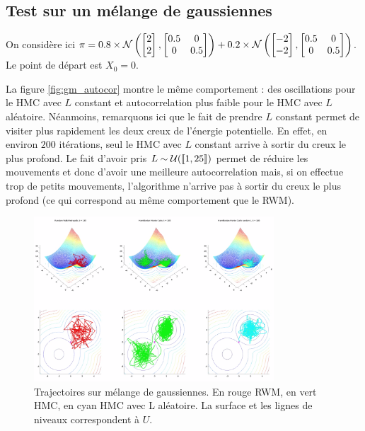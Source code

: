 \documentclass[10pt,a4paper]{article}
\begin{document}
\pagebreak
\subsection{Test sur un mélange de gaussiennes}
On considère ici $\pi = 0.8 \times \mathcal{N}\left(\begin{bmatrix} 2 \\ 2 \end{bmatrix}, \begin{bmatrix}
0.5 & 0 \\ 0 & 0.5 \end{bmatrix}\right) + 0.2 \times \mathcal{N}\left(\begin{bmatrix} -2 \\ -2 \end{bmatrix}, \begin{bmatrix} 0.5 & 0 \\ 0 & 0.5 \end{bmatrix}\right)$. Le point de départ est $X_0 = 0$. 

La figure \ref{fig:gm_autocor} montre le même comportement : des oscillations pour le HMC avec $L$ constant et autocorrelation plus faible pour le HMC avec $L$ aléatoire. Néanmoins, remarquons ici que le fait de prendre $L$ constant permet de visiter plus rapidement les deux creux de l'énergie potentielle. En effet, en environ $200$ itérations, seul le HMC avec $L$ constant arrive à sortir du creux le plus profond. Le fait d'avoir pris $L \sim \mathcal{U}({\left\llbracket 1,25 \right\rrbracket})$ permet de réduire les mouvements et donc d'avoir une meilleure autocorrelation mais, si on effectue trop de petits mouvements, l'algorithme n'arrive pas à sortir du creux le plus profond (ce qui correspond au même comportement que le RWM). 

\begin{figure}[ht]
  \centering
  \includegraphics[width=0.8\textwidth]{figs/gm.png}
  \caption{Trajectoires sur mélange de gaussiennes. En rouge RWM, en vert HMC, en cyan HMC avec L aléatoire. La surface et les lignes de niveaux correspondent à $U$. \label{fig:gm}}
\end{figure}
\end{document}
